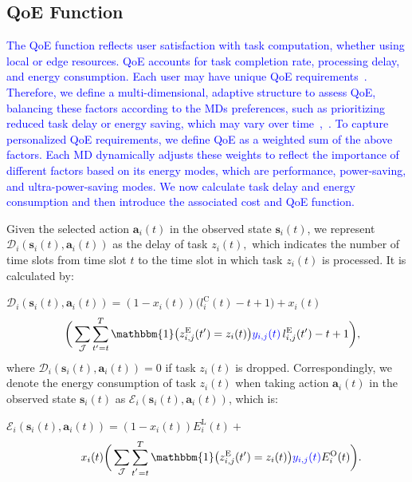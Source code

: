\documentclass[12pt,draftclsnofoot,onecolumn]{IEEEtran}
\begin{document}
\subsection{QoE Function}
\textcolor{blue}{The QoE function reflects user satisfaction with task computation, whether using local or edge resources. QoE accounts for task completion rate, processing delay, and energy consumption. Each user may have unique QoE requirements~\cite{wang2017qoe}. Therefore, we define a multi-dimensional, adaptive structure to assess QoE, balancing these factors according to the MDs preferences, such as prioritizing reduced task delay or energy saving, which may vary over time~\cite{lu2020edge},~\cite{wang2019intelligent}. To capture personalized QoE requirements, we define QoE as a weighted sum of the above factors. Each MD dynamically adjusts these weights to reflect the importance of different factors based on its energy modes, which are performance, power-saving, and ultra-power-saving modes. We now calculate task delay and energy consumption and then introduce the associated cost and QoE function.}

Given the selected action $\boldsymbol{a}_i(t)$ in the observed state $\boldsymbol{s}_i(t)$, we represent $\mathcal{D}_i(\boldsymbol{s}_i(t), \boldsymbol{a}_i(t))$ as the delay of task $z_i(t),$ which indicates the number of time slots from time slot $t$ to the time slot in which task $z_i(t)$ is processed. It is calculated by: \vspace{2mm}

$\mathcal{D}_i(\boldsymbol{s}_i(t),\boldsymbol{a}_i(t)) = (1-x_i(t))\Big(l_i^{\text{C}}(t) - t + 1\Big)  +  x_i(t)$
\begin{alignat}{1}
	\;\;\;\,\bigg( \sum\limits_{\mathcal{J}} \sum\limits_{t'=t}^{T} \mathbbm{1}\big(z_{i,j}^{\text{E}}(t') = z_i(t)\big) \textcolor{blue}{y_{i,j}(t)} \, l_{i,j}^{\text{E}}(t') - t +1\bigg),
	\label{21}  
\end{alignat} 
where $\mathcal{D}_i(\boldsymbol{s}_i(t),\boldsymbol{a}_i(t))= 0$ if task $z_i(t)$ is dropped. Correspondingly, we denote the energy consumption of task $z_i(t)$ when taking action $\boldsymbol{a}_i(t)$ in the observed state $\boldsymbol{s}_i(t)$ as $\mathcal{E}_i(\boldsymbol{s}_i(t),\boldsymbol{a}_i(t))$, which is: \vspace{1.7mm}


$\mathcal{E}_i(\boldsymbol{s}_i(t),\boldsymbol{a}_i(t)) = (1-x_i(t)) E_i^{\text{L}}(t)+$
\begin{alignat}{1}
	\hspace{0.9cm} x_i(t)\bigg( \sum\limits_{\mathcal{J}} \sum\limits_{t^{'}=t}^{T}\mathbbm{1}\big(z_{i,j}^{\text{E}}(t') = z_i(t)\big) \textcolor{blue}{y_{i,j}(t)}  E_i^{\text{O}}(t)  \bigg).
	\label{22}  
\end{alignat}
\end{document}
